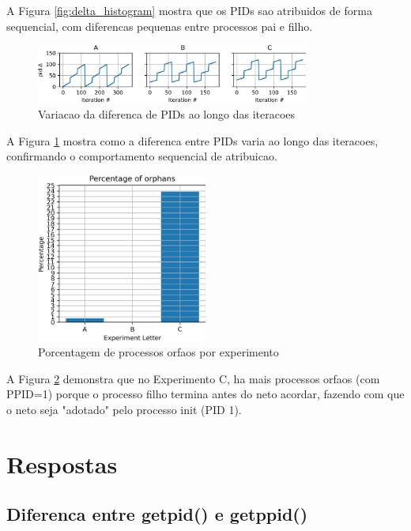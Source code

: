 \documentclass[12pt]{article}
\begin{document}
A Figura \ref{fig:delta_histogram} mostra que os PIDs sao atribuidos de forma sequencial, com diferencas pequenas entre processos pai e filho.

\begin{figure}[h]
    \centering
    \includegraphics[width=0.8\textwidth]{figures/delta_iteration.png}
    \caption{Variacao da diferenca de PIDs ao longo das iteracoes}
    \label{fig:delta_iteration}
\end{figure}

A Figura \ref{fig:delta_iteration} mostra como a diferenca entre PIDs varia ao longo das iteracoes, confirmando o comportamento sequencial de atribuicao.

\begin{figure}[h]
    \centering
    \includegraphics[width=0.5\textwidth]{figures/orphans.png}
    \caption{Porcentagem de processos orfaos por experimento}
    \label{fig:orphans}
\end{figure}

A Figura \ref{fig:orphans} demonstra que no Experimento C, ha mais processos orfaos (com PPID=1) porque o processo filho termina antes do neto acordar, fazendo com que o neto seja "adotado" pelo processo init (PID 1).

\section{Respostas}

\subsection{Diferenca entre getpid() e getppid()}
\end{document}
